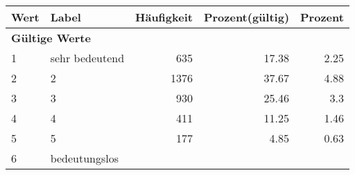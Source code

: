      \begin{longtable}{lXrrr}
     \toprule
     \textbf{Wert} & \textbf{Label} & \textbf{Häufigkeit} & \textbf{Prozent(gültig)} & \textbf{Prozent} \\
     \endhead
     \midrule
     \multicolumn{5}{l}{\textbf{Gültige Werte}}\\

     1 &
     \multicolumn{1}{X}{ sehr bedeutend   } &


       \num{635} &
       \num[round-mode=places,round-precision=2]{17,38} &
         \num[round-mode=places,round-precision=2]{2,25} \\

     2 &
     \multicolumn{1}{X}{ 2   } &


       \num{1376} &
       \num[round-mode=places,round-precision=2]{37,67} &
         \num[round-mode=places,round-precision=2]{4,88} \\

     3 &
     \multicolumn{1}{X}{ 3   } &


       \num{930} &
       \num[round-mode=places,round-precision=2]{25,46} &
         \num[round-mode=places,round-precision=2]{3,3} \\

     4 &
     \multicolumn{1}{X}{ 4   } &


       \num{411} &
       \num[round-mode=places,round-precision=2]{11,25} &
         \num[round-mode=places,round-precision=2]{1,46} \\

     5 &
     \multicolumn{1}{X}{ 5   } &


       \num{177} &
       \num[round-mode=places,round-precision=2]{4,85} &
         \num[round-mode=places,round-precision=2]{0,63} \\

     6 &
     \multicolumn{1}{X}{ bedeutungslos   } &



\end{longtable}
